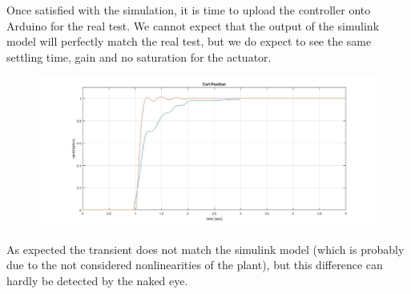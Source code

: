 Once satisfied with the simulation, it is time to upload the controller onto Arduino for the real test. We cannot expect that the output of the simulink model will perfectly match the real test, but we do expect to see the same settling time, gain and no saturation for the actuator.

\begin{figure}[h]
\includegraphics[width=\textwidth]{img/response_ls.jpg}
\end{figure}

As expected the transient does not match the simulink model (which is probably due to the not considered nonlinearities of the plant), but this difference can hardly be detected by the naked eye. 
